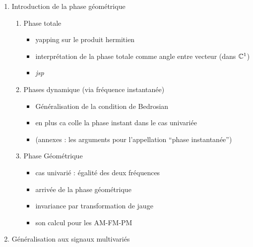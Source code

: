 \begin{enumerate}[label=\arabic* --- ]
	\item Introduction de la phase géométrique
	\begin{enumerate}[label=\arabic{enumi}.\arabic* --- ]
		
		\item Phase totale
		\begin{itemize} \normalfont 
			\item yapping sur le produit hermitien
			
			\item interprétation de la phase totale comme angle entre vecteur (dans $\mathbb{C}^1$)
			
			\item \textit{jsp}
		\end{itemize}
		
		\item Phases dynamique (via fréquence instantanée)
		\begin{itemize} \normalfont
			
			\item Généralisation de la condition de Bedrosian 
			
			\item en plus ca colle la phase instant dans le cas univariée
			
			\item (annexes : les arguments pour l'appellation ``phase instantanée'')
			
		\end{itemize}
		
		\item Phase Géométrique
		\begin{itemize} \normalfont
			
			\item cas univarié : égalité des deux fréquences
			
			\item arrivée de la phase géométrique
			
			\item invariance par transformation de jauge 
			
			\item son calcul pour les AM-FM-PM
			
		\end{itemize}
	\end{enumerate}	
	
	\item Généralisation aux signaux multivariés
	\begin{itemize}\normalfont
		

\end{itemize}
\end{enumerate}
